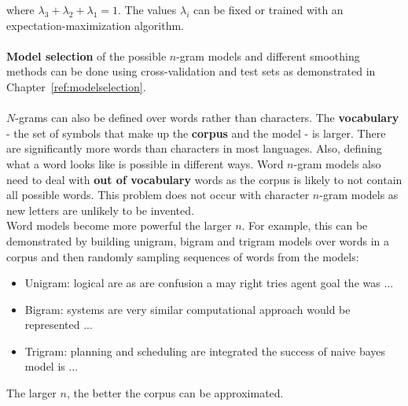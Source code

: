 \documentclass{report}
\begin{document}
where $\lambda_3 + \lambda_2 + \lambda_1 = 1$. The values $\lambda_i$ can be fixed or trained with an expectation-maximization algorithm.
\\ \\
{\bf Model selection} of the possible $n$-gram models and different smoothing methods can be done using cross-validation and test sets as demonstrated in Chapter~\ref{ref:modelselection}.
\\ \\
$N$-grams can also be defined over words rather than characters. The {\bf vocabulary} - the set of symbols that make up the {\bf corpus} and the model - is larger.
There are significantly more words than characters in most languages. Also, defining what a word looks like is possible in different ways.
Word $n$-gram models also need to deal with {\bf out of vocabulary} words as the corpus is likely to not contain all possible words.
This problem does not occur with character $n$-gram models as new letters are unlikely to be invented.
\\
Word models become more powerful the larger $n$. For example, this can be demonstrated by building unigram, bigram and trigram models over words in a corpus and then randomly sampling sequences of words from the models:
\begin{itemize}
\item Unigram: logical are as are confusion a may right tries agent goal the was ...
\item Bigram: systems are very similar computational approach would be represented ...
\item Trigram: planning and scheduling are integrated the success of naive bayes model is ...
\end{itemize}
The larger $n$, the better the corpus can be approximated.
\end{document}
